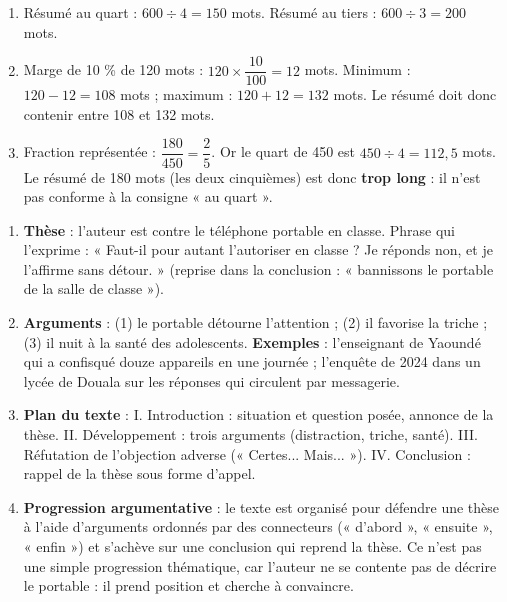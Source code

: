 \documentclass[11pt]{article}
\begin{document}
\begin{corrige}
\begin{enumerate}
\item Résumé au quart : $600 \div 4 = 150$ mots. Résumé au tiers : $600 \div 3 = 200$ mots.
\item Marge de 10 \% de 120 mots : $120 \times \dfrac{10}{100} = 12$ mots. Minimum : $120 - 12 = 108$ mots ; maximum : $120 + 12 = 132$ mots. Le résumé doit donc contenir entre 108 et 132 mots.
\item Fraction représentée : $\dfrac{180}{450} = \dfrac{2}{5}$. Or le quart de 450 est $450 \div 4 = 112,5$ mots. Le résumé de 180 mots (les deux cinquièmes) est donc \textbf{trop long} : il n'est pas conforme à la consigne « au quart ».
\end{enumerate}
\end{corrige}

\begin{corrige}
\begin{enumerate}
\item \textbf{Thèse} : l'auteur est contre le téléphone portable en classe. Phrase qui l'exprime : « Faut-il pour autant l'autoriser en classe ? Je réponds non, et je l'affirme sans détour. » (reprise dans la conclusion : « bannissons le portable de la salle de classe »).
\item \textbf{Arguments} : (1) le portable détourne l'attention ; (2) il favorise la triche ; (3) il nuit à la santé des adolescents. \textbf{Exemples} : l'enseignant de Yaoundé qui a confisqué douze appareils en une journée ; l'enquête de 2024 dans un lycée de Douala sur les réponses qui circulent par messagerie.
\item \textbf{Plan du texte} : I. Introduction : situation et question posée, annonce de la thèse. II. Développement : trois arguments (distraction, triche, santé). III. Réfutation de l'objection adverse (« Certes... Mais... »). IV. Conclusion : rappel de la thèse sous forme d'appel.
\item \textbf{Progression argumentative} : le texte est organisé pour défendre une thèse à l'aide d'arguments ordonnés par des connecteurs (« d'abord », « ensuite », « enfin ») et s'achève sur une conclusion qui reprend la thèse. Ce n'est pas une simple progression thématique, car l'auteur ne se contente pas de décrire le portable : il prend position et cherche à convaincre.
\end{enumerate}
\end{corrige}
\end{document}
